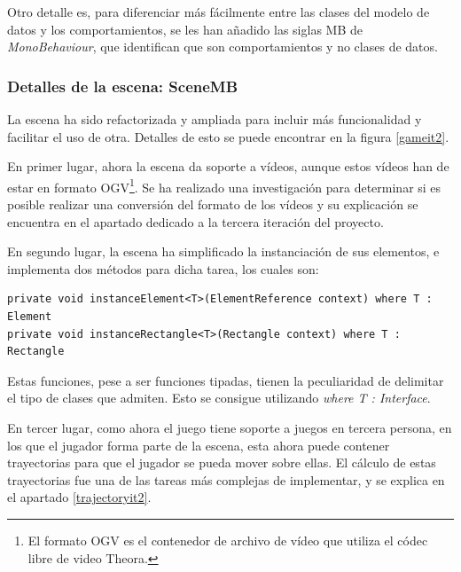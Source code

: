 Otro detalle es, para diferenciar más fácilmente entre las clases del modelo de datos y los comportamientos, se les han añadido las siglas MB de \textit{MonoBehaviour}, que identifican que son comportamientos y no clases de datos.

\subsubsection{Detalles de la escena: SceneMB}
\label{scene}

La escena ha sido refactorizada y ampliada para incluir más funcionalidad y facilitar el uso de otra. Detalles de esto se puede encontrar en la figura \ref{gameit2}.

En primer lugar, ahora la escena da soporte a vídeos, aunque estos vídeos han de estar en formato OGV\footnote{El formato OGV es el contenedor de archivo de vídeo que utiliza el códec libre de video Theora.}. Se ha realizado una investigación para determinar si es posible realizar una conversión del formato de los vídeos y su explicación se encuentra en el apartado dedicado a la tercera iteración del proyecto.

En segundo lugar, la escena ha simplificado la instanciación de sus elementos, e implementa dos métodos para dicha tarea, los cuales son:

\begin{lstlisting}
private void instanceElement<T>(ElementReference context) where T : Element
private void instanceRectangle<T>(Rectangle context) where T : Rectangle
\end{lstlisting}

Estas funciones, pese a ser funciones tipadas, tienen la peculiaridad de delimitar el tipo de clases que admiten. Esto se consigue utilizando \textit{where T : Interface}.

En tercer lugar, como ahora el juego tiene soporte a juegos en tercera persona, en los que el jugador forma parte de la escena, esta ahora puede contener trayectorias para que el jugador se pueda mover sobre ellas. El cálculo de estas trayectorias fue una de las tareas más complejas de implementar, y se explica en el apartado \ref{trajectoryit2}.


